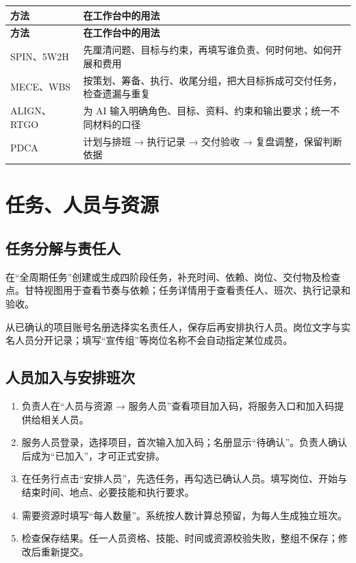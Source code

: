 \documentclass[UTF8,fontset=windows,zihao=-4,a4paper]{ctexart}
\begin{document}
\begingroup\small\setlength{\tabcolsep}{5pt}\renewcommand{\arraystretch}{1.28}
\begin{longtable}{>{\raggedright\arraybackslash}p{0.28\dimexpr\linewidth-4\tabcolsep\relax}>{\raggedright\arraybackslash}p{0.72\dimexpr\linewidth-4\tabcolsep\relax}}
\toprule
\textbf{方法} & \textbf{在工作台中的用法} \\
\midrule\endfirsthead
\toprule
\textbf{方法} & \textbf{在工作台中的用法} \\
\midrule\endhead
\bottomrule\endfoot
SPIN、5W2H & 先厘清问题、目标与约束，再填写谁负责、何时何地、如何开展和费用 \\
MECE、WBS & 按策划、筹备、执行、收尾分组，把大目标拆成可交付任务，检查遗漏与重复 \\
ALIGN、RTGO & 为 AI 输入明确角色、目标、资料、约束和输出要求；统一不同材料的口径 \\
PDCA & 计划与排班 → 执行记录 → 交付验收 → 复盘调整，保留判断依据 \\
\end{longtable}\endgroup

\section{任务、人员与资源}\label{sec:3}

\subsection*{任务分解与责任人}

在“全周期任务”创建或生成四阶段任务，补充时间、依赖、岗位、交付物及检查点。甘特视图用于查看节奏与依赖；任务详情用于查看责任人、班次、执行记录和验收。


从已确认的项目账号名册选择实名责任人，保存后再安排执行人员。岗位文字与实名人员分开记录；填写“宣传组”等岗位名称不会自动指定某位成员。


\subsection*{人员加入与安排班次}

\begin{enumerate}[start=1]

\item 负责人在“人员与资源 → 服务人员”查看项目加入码，将服务入口和加入码提供给相关人员。

\item 服务人员登录，选择项目，首次输入加入码；名册显示“待确认”。负责人确认后成为“已加入”，才可正式安排。

\item 在任务行点击“安排人员”，先选任务，再勾选已确认人员。填写岗位、开始与结束时间、地点、必要技能和执行要求。

\item 需要资源时填写“每人数量”。系统按人数计算总预留，为每人生成独立班次。

\item 检查保存结果。任一人员资格、技能、时间或资源校验失败，整组不保存；修改后重新提交。

\end{enumerate}
\end{document}
